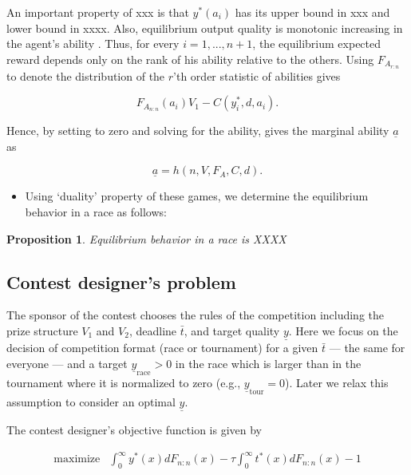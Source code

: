 \documentclass[12pt,]{article}
\providecommand{\tightlist}{%
  \setlength{\itemsep}{0pt}\setlength{\parskip}{0pt}}
\newtheorem{proposition}{Proposition}
\newcommand\deadline{\bar{t}}
\newcommand\target{\underline{y}}
\newcommand\race{\text{race}}
\newcommand\tournament{\text{tour}}
\begin{document}
An important property of xxx is that \(y^*(a_i)\) has its upper bound in
xxx and lower bound in xxxx. Also, equilibrium output quality is
monotonic increasing in the agent's ability
\citep[see][]{moldovanu2001optimal}. Thus, for every \(i=1, ..., n+1\),
the equilibrium expected reward depends only on the rank of his ability
relative to the others. Using \({F_{A_{r:n}}}\) to denote the
distribution of the \(r\)'th order statistic of abilities gives

\[\label{eq: expected payoffs tournament}
  {F_{A_{n:n}}}(a_i) V_1  - C(y_i^*, d, a_i).\]

Hence, by setting to zero and solving for the ability, gives the
marginal ability \({\underline a}\) as

\[{\underline a}= h(n, V, F_A, C, d).\]

\begin{itemize}
\tightlist
\item
  Using `duality' property of these games, we determine the equilibrium
  behavior in a race as follows:
\end{itemize}

\begin{proposition}
  Equilibrium behavior in a race is XXXX
\end{proposition}

\subsection{Contest designer's problem}\label{contest-designers-problem}

The sponsor of the contest chooses the rules of the competition
including the prize structure \(V_1\) and \(V_2\), deadline
\(\deadline\), and target quality \(\target\). Here we focus on the
decision of competition format (race or tournament) for a given
\(\deadline\) --- the same for everyone --- and a target
\(\target_\race>0\) in the race which is larger than in the tournament
where it is normalized to zero (e.g., \(\target_\tournament = 0\)).
Later we relax this assumption to consider an optimal \(\target\).

The contest designer's objective function is given by

\begin{equation}
\begin{array}{ll}
    \mbox{maximize} & \int_{0}^{\infty} y^*(x) dF_{n:n}(x)
      - \tau \int_{0}^{\infty} t^*(x) dF_{n:n}(x) 
      - 1
  \end{array}
\end{equation}
\end{document}
